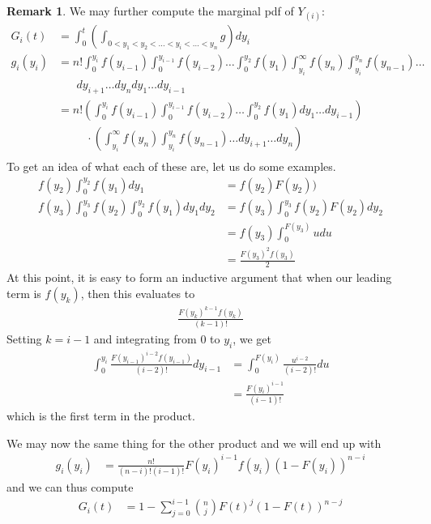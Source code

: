 \documentclass[11pt]{amsart}
\theoremstyle{definition}
\newtheorem{remark}[theorem]{Remark}
\numberwithin{equation}{section}
\begin{document}
\begin{remark}
     We may further compute the marginal pdf of $Y_{(i)}:$
     \begin{align*}
         G_i(t)&=\int_{0}^t\left(\int_{0<y_1<y_2<\ldots<y_i<\ldots<y_n}g\right)dy_i\\
         g_i(y_i)&=n!\int_0^{y_i}f(y_{i-1})\int_0^{y_{i-1}}f(y_{i-2})\ldots\int_0^{y_2}f(y_1)\int_{y_i}^\infty f(y_n)\int_{y_i}^{y_n} f(y_{n-1})\ldots  \\
         &\hspace{20pt}dy_{i+1}\ldots dy_n dy_1\ldots dy_{i-1}\\
         &=n!\left(\int_0^{y_i}f(y_{i-1})\int_0^{y_{i-1}}f(y_{i-2})\ldots\int_0^{y_2}f(y_1)dy_1\ldots dy_{i-1}\right)\\
         &\hspace{30pt}\cdot\left(\int_{y_i}^\infty f(y_n)\int_{y_i}^{y_n} f(y_{n-1})\ldots dy_{i+1}\ldots dy_n\right)\\
     \end{align*}
     To get an idea of what each of these are, let us do some examples.
     \begin{align*}
         f(y_2)\int_0^{y_2}f(y_1)dy_1&=f(y_2)F(y_2))\\
         f(y_3)\int_0^{y_3}f(y_2)\int_0^{y_2}f(y_1)dy_1dy_2&=f(y_3)\int_0^{y_3}f(y_2)F(y_2)dy_2\\
         &=f(y_3)\int_0^{F(y_3)}udu\\
         &=\frac{F(y_3)^2f(y_3)}{2}
     \end{align*}
     At this point, it is easy to form an inductive argument that when our leading term is $f(y_k)$, then this evaluates to 
     \begin{align*}
         \frac{F(y_k)^{k-1}f(y_k)}{(k-1)!}
     \end{align*}
     Setting $k=i-1$ and integrating from $0$ to $y_i$, we get
     \begin{align*}
         \int_0^{y_i}\frac{F(y_{i-1})^{i-2}f(y_{i-1})}{(i-2)!}dy_{i-1}&=\int_0^{F(y_i)}\frac{u^{i-2}}{(i-2)!}du\\
         &=\frac{F(y_i)^{i-1}}{(i-1)!}
     \end{align*}
     which is the first term in the product.
     
     We may now the same thing for the other product and we will end up with
     \begin{align*}
         g_i(y_i)&=\frac{n!}{(n-i)!(i-1)!}F(y_i)^{i-1}f(y_i)(1-F(y_i))^{n-i}
     \end{align*}
     and we can thus compute
     \begin{align*}
         G_i(t)&=1-\sum_{j=0}^{i-1}\binom{n}{j}F(t)^j(1-F(t))^{n-j}
     \end{align*}
 \end{remark}
\end{document}
